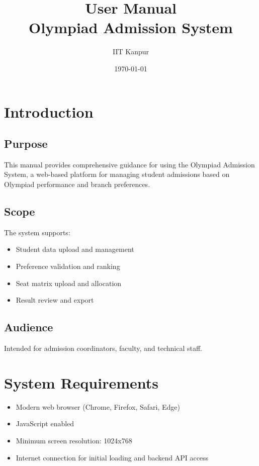 \documentclass[12pt,a4paper]{article}
\title{User Manual\\Olympiad Admission System}
\author{IIT Kanpur}
\date{\today}
\begin{document}
\maketitle

\tableofcontents
\newpage

\section{Introduction}
\subsection{Purpose}
This manual provides comprehensive guidance for using the Olympiad Admission System, a web-based platform for managing student admissions based on Olympiad performance and branch preferences.

\subsection{Scope}
The system supports:
\begin{itemize}
    \item Student data upload and management
    \item Preference validation and ranking
    \item Seat matrix upload and allocation
    \item Result review and export
\end{itemize}

\subsection{Audience}
Intended for admission coordinators, faculty, and technical staff.

\section{System Requirements}
\begin{itemize}
    \item Modern web browser (Chrome, Firefox, Safari, Edge)
    \item JavaScript enabled
    \item Minimum screen resolution: 1024x768
    \item Internet connection for initial loading and backend API access
\end{itemize}

\end{document}
